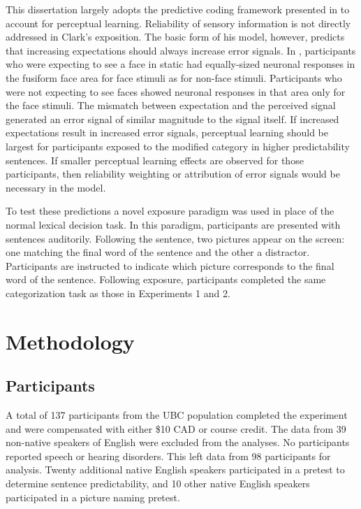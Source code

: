 This dissertation largely adopts the predictive coding framework presented in \citet{Clark2013} to account for perceptual learning.
Reliability of sensory information is not directly addressed in Clark's exposition.
The basic form of his model, however, predicts that increasing expectations should always increase error signals.
In \citet[cited in \citet{Clark2013}]{Egner2010}, participants who were expecting to see a face in static had equally-sized neuronal responses in the fusiform face area for face stimuli as for non-face stimuli.  
Participants who were not expecting to see faces showed neuronal responses in that area only for the face stimuli.
The mismatch between expectation and the perceived signal generated an error signal of similar magnitude to the signal itself.
If increased expectations result in increased error signals, perceptual learning should be largest for participants exposed to the modified category in higher predictability sentences.
If smaller perceptual learning effects are observed for those participants, then reliability weighting or attribution of error signals would be necessary in the model.

To test these predictions a novel exposure paradigm was used in place of the normal lexical decision task.  
In this paradigm, participants are presented with sentences auditorily.  
Following the sentence, two pictures appear on the screen: one matching the final word of the sentence and the other a distractor. 
Participants are instructed to indicate which picture corresponds to the final word of the sentence.
Following exposure, participants completed the same categorization task as those in Experiments 1 and 2.

\section{Methodology}

\subsection{Participants}

A total of 137 participants from the UBC population completed the experiment and were compensated with either \$10 CAD or course credit.  
The data from 39 non-native speakers of English were excluded from the analyses.
No participants reported speech or hearing disorders.
This left data from 98 participants for analysis.
Twenty additional native English speakers participated in a pretest to determine sentence predictability, and 10 other native English speakers participated in a picture naming pretest.

